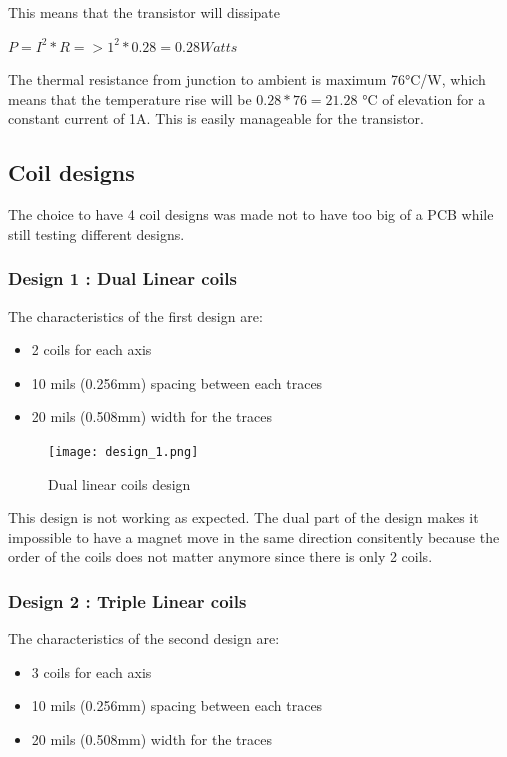 This means that the transistor will dissipate

$ P = I^2 * R => 1^2 * 0.28 = 0.28  Watts $

The thermal resistance from junction to ambient is maximum 76°C/W, which means that the temperature rise will be $ 0.28 * 76 = 21.28 $ °C of elevation for a constant current of 1A. This is easily manageable for the transistor.

\subsection{Coil designs}

The choice to have 4 coil designs was made not to have too big of a PCB while still testing different designs.

\subsubsection{Design 1 : Dual Linear coils}

The characteristics of the first design are:

\begin{itemize}
	\item 2 coils for each axis
	\item 10 mils (0.256mm) spacing between each traces
	\item 20 mils (0.508mm) width for the traces
\end{itemize}

\begin{figure}[H]
	\centering
	\texttt{[image: design\_1.png]}
	\caption[Dual linear coils design]{Dual linear coils design}
	\label{fig:dual_linear}
\end{figure}

This design is not working as expected. The dual part of the design makes it impossible to have a magnet move in the same direction consitently because the order of the coils does not matter anymore since there is only 2 coils.

\subsubsection{Design 2 : Triple Linear coils}

The characteristics of the second design are:

\begin{itemize}
	\item 3 coils for each axis
	\item 10 mils (0.256mm) spacing between each traces
	\item 20 mils (0.508mm) width for the traces
\end{itemize}

